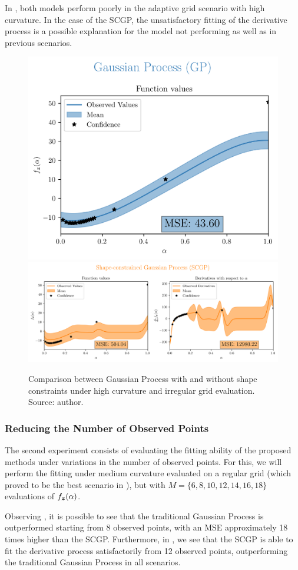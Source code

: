 In , both models perform poorly in the adaptive grid scenario with high curvature. In the case of the SCGP, the unsatisfactory fitting of the derivative process is a possible explanation for the model not performing as well as in previous scenarios.

\begin{figure}[H]
    \centering
    \includegraphics[width=.33\textwidth]{../experiments/adaptive_new_HC/GP_20_nobs.png}
    \includegraphics[width=.66\textwidth]{../experiments/adaptive_new_HC/SCGP_20_nobs.png}
    \caption{ {\small Comparison between Gaussian Process with and without shape constraints under high curvature and irregular grid evaluation. Source: author.}}
    \label{fig:adaptiveHC}
\end{figure}

\subsubsection{Reducing the Number of Observed Points}
\label{sec:reducingMC}

The second experiment consists of evaluating the fitting ability of the proposed methods under variations in the number of observed points.
For this, we will perform the fitting under medium curvature evaluated on a regular grid (which proved to be the best scenario in ), but with \( M=\{6, 8, 10, 12, 14, 16, 18\} \) evaluations of \( f_{\boldsymbol{z}}(\alpha) \).

Observing , it is possible to see that the traditional Gaussian Process is outperformed starting from 8 observed points, with an MSE approximately 18 times higher than the SCGP. Furthermore, in , we see that the SCGP is able to fit the derivative process satisfactorily from 12 observed points, outperforming the traditional Gaussian Process in all scenarios.

